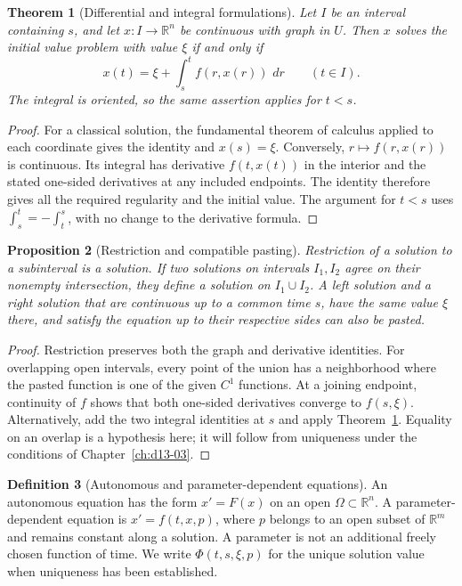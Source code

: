 \documentclass[11pt,oneside]{book}
\newtheorem{theorem}{Theorem}[chapter]
\newtheorem{proposition}[theorem]{Proposition}
\theoremstyle{definition}
\newtheorem{definition}[theorem]{Definition}
\theoremstyle{remark}\newtheorem{remark}[theorem]{Remark}
\newcommand{\R}{\mathbb R}\newcommand{\C}{\mathbb C}
\newcommand{\dd}{\,d}\newcommand{\id}{\operatorname{id}}
\begin{document}
\begin{theorem}[Differential and integral formulations]\label{d13:01:integral}
Let $I$ be an interval containing $s$, and let $x:I\to\R^n$ be continuous
with graph in $U$. Then $x$ solves the initial value problem with value
$\xi$ if and only if
\[
 x(t)=\xi+\int_s^t f(r,x(r))\,\dd r\qquad(t\in I).
\]
The integral is oriented, so the same assertion applies for $t<s$.
\end{theorem}
\begin{proof}
For a classical solution, the fundamental theorem of calculus applied to
each coordinate gives the identity and $x(s)=\xi$. Conversely,
$r\mapsto f(r,x(r))$ is continuous. Its integral has derivative
$f(t,x(t))$ in the interior and the stated one-sided derivatives at any
included endpoints. The identity therefore gives all the required
regularity and the initial value. The argument for $t<s$ uses
$\int_s^t=-\int_t^s$, with no change to the derivative formula.
\end{proof}

\begin{proposition}[Restriction and compatible pasting]\label{d13:01:pasting}
Restriction of a solution to a subinterval is a solution. If two solutions
on intervals $I_1,I_2$ agree on their nonempty intersection, they define a
solution on $I_1\cup I_2$. A left solution and a right solution that are
continuous up to a common time $s$, have the same value $\xi$ there, and
satisfy the equation up to their respective sides can also be pasted.
\end{proposition}
\begin{proof}
Restriction preserves both the graph and derivative identities. For
overlapping open intervals, every point of the union has a neighborhood
where the pasted function is one of the given $C^1$ functions. At a
joining endpoint, continuity of $f$ shows that both one-sided derivatives
converge to $f(s,\xi)$. Alternatively, add the two integral identities at
$s$ and apply Theorem~\ref{d13:01:integral}. Equality on an overlap is a
hypothesis here; it will follow from uniqueness under the conditions of
Chapter~\ref{ch:d13-03}.
\end{proof}

\begin{definition}[Autonomous and parameter-dependent equations]\label{d13:01:autonomous}
An autonomous equation has the form $x'=F(x)$ on an open
$\Omega\subset\R^n$. A parameter-dependent equation is
$x'=f(t,x,p)$, where $p$ belongs to an open subset of $\R^m$ and remains
constant along a solution. A parameter is not an additional freely chosen
function of time. We write $\Phi(t,s,\xi,p)$ for the unique solution value
when uniqueness has been established.
\end{definition}
\end{document}
